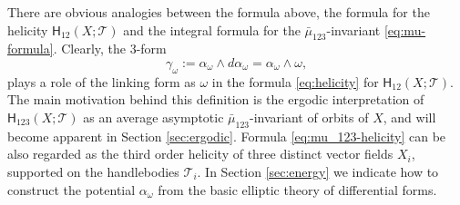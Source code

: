 \documentclass[12pt]{article}
\begin{document}
 There are obvious analogies between the formula above, the formula for the helicity $\mathsf{H}_{12}(X;\mathcal{T})$ and the integral formula for the 
$\bar{\mu}_{123}$-invariant \eqref{eq:mu-formula}. Clearly, the 3-form 
 \[
 \gamma_\omega:=\alpha_\omega\wedge d\alpha_\omega=\alpha_\omega\wedge \omega,
 \]
 plays a role of the linking form as $\omega$ in the formula \eqref{eq:helicity} for $\mathsf{H}_{12}(X;\mathcal{T})$. 
 The main motivation behind this definition is the ergodic interpretation  of $\mathsf{H}_{123}(X;\mathcal{T})$ as an average asymptotic $\bar{\mu}_{123}$-invariant of orbits of $X$, and will become apparent in Section \ref{sec:ergodic}. Formula \eqref{eq:mu_123-helicity} can be also 
 regarded as the third order helicity of three distinct vector fields $X_i$, supported on the handlebodies $\mathcal{T}_i$. In Section \ref{sec:energy} we indicate how to construct the potential $\alpha_\omega$ from the basic elliptic theory of differential forms.
\end{document}
